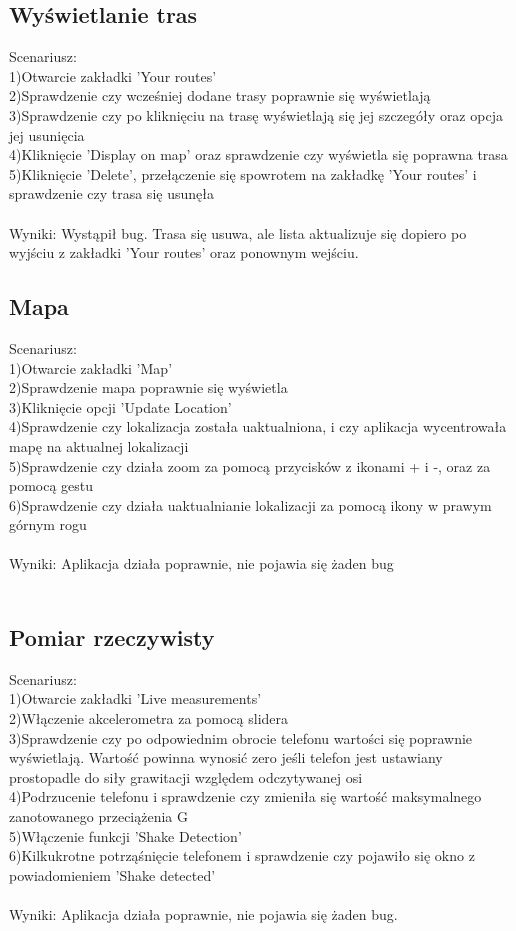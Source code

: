 \subsection{Wyświetlanie tras} %
Scenariusz:\\
1)Otwarcie zakładki 'Your routes'\\
2)Sprawdzenie czy wcześniej dodane trasy poprawnie się wyświetlają\\
3)Sprawdzenie czy po kliknięciu na trasę wyświetlają się jej szczegóły oraz opcja jej usunięcia\\
4)Kliknięcie 'Display on map' oraz sprawdzenie czy wyświetla się poprawna trasa\\
5)Kliknięcie 'Delete', przełączenie się spowrotem na zakładkę 'Your routes' i sprawdzenie czy trasa się usunęła\\\\
Wyniki: Wystąpił bug. Trasa się usuwa, ale lista aktualizuje się dopiero po wyjściu z zakładki 'Your routes' oraz ponownym wejściu.
\subsection{Mapa} %
Scenariusz:\\
1)Otwarcie zakładki 'Map'\\
2)Sprawdzenie mapa poprawnie się wyświetla\\
3)Kliknięcie opcji 'Update Location'\\
4)Sprawdzenie czy lokalizacja została uaktualniona, i czy aplikacja wycentrowała mapę na aktualnej lokalizacji\\
5)Sprawdzenie czy działa zoom za pomocą przycisków z ikonami + i -, oraz za pomocą gestu\\
6)Sprawdzenie czy działa uaktualnianie lokalizacji za pomocą ikony w prawym górnym rogu \\\\
Wyniki: Aplikacja działa poprawnie, nie pojawia się żaden bug\\\\
\newpage
\subsection{Pomiar rzeczywisty} %
Scenariusz:\\
1)Otwarcie zakładki 'Live measurements'\\
2)Włączenie akcelerometra za pomocą slidera\\
3)Sprawdzenie czy po odpowiednim obrocie telefonu wartości się poprawnie wyświetlają. Wartość powinna wynosić zero jeśli telefon jest ustawiany prostopadle do siły grawitacji względem odczytywanej osi\\
4)Podrzucenie telefonu i sprawdzenie czy zmieniła się wartość maksymalnego zanotowanego przeciążenia G\\
5)Włączenie funkcji 'Shake Detection'\\
6)Kilkukrotne potrząśnięcie telefonem i sprawdzenie czy pojawiło się okno z powiadomieniem 'Shake detected'\\\\
Wyniki: Aplikacja działa poprawnie, nie pojawia się żaden bug.

